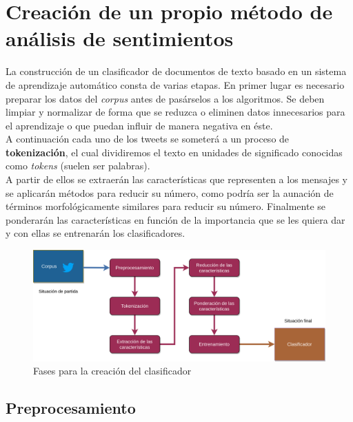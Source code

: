\documentclass[a4paper,12pt]{report}
\begin{document}
\clearpage

\section{Creación de un propio método de análisis de sentimientos}

{\setlength{\parindent}{0cm}
La construcción de un clasificador de documentos de texto basado en un sistema de aprendizaje automático consta de varias etapas. En primer lugar es necesario preparar los datos del \textit{corpus} antes de pasárselos a los algoritmos. Se deben limpiar y normalizar de forma que se reduzca o eliminen datos innecesarios para el aprendizaje o que puedan influir de manera negativa en éste.}
\vspace{2mm}\\
A continuación cada uno de los tweets se someterá a un proceso de \textbf{tokenización}, el cual dividiremos el texto en unidades de significado conocidas como \textit{tokens} (suelen ser palabras).\vspace{2mm}\\
A partir de ellos se extraerán las características que representen a los mensajes y se aplicarán métodos para reducir su número, como podría ser la aunación de términos morfológicamente similares para reducir su número. Finalmente se ponderarán las características en función de la importancia que se les quiera dar y con ellas se entrenarán los clasificadores. 

\vspace{4mm}
\begin{figure}[htbp!]
\centering
\includegraphics[scale=0.65]{images/Fases_SA.png}
\caption{Fases para la creación del clasificador}
\end{figure}
\vspace{2mm}


\subsection{Preprocesamiento}
\end{document}
